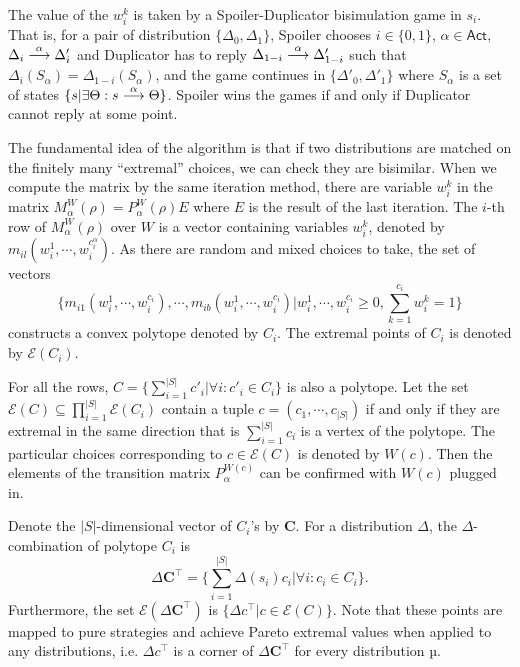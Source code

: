 \documentclass[runningheads]{llncs}
\begin{document}
The value of the $w^{k}_{i}$ is taken by a Spoiler-Duplicator bisimulation game in $s_{i}$. That is, for a pair of distribution $\{\Delta_{0},\Delta_{1}\}$, Spoiler chooses $i\in\{0,1\}$, $\alpha\in\mathsf{Act}$, $\Delta_{i}\mathrel{\stackrel{\alpha}{\longrightarrow}}\Delta'_{i}$ and Duplicator has to reply 
$\Delta_{1-i}\mathrel{\stackrel{\alpha}{\longrightarrow}}\Delta'_{1-i}$ such that $\Delta_{i}(S_{\alpha})=\Delta_{1-i}(S_{\alpha})$, and the game continues in $\{\Delta'_{0},\Delta'_{1}\}$ where $S_{\alpha}$ is a set of states $\{s|\exists\Theta : s\mathrel{\stackrel{\alpha}{\longrightarrow}}\Theta\}$. Spoiler wins the games if and only if Duplicator cannot reply at some point.

The fundamental idea of the algorithm is that if two distributions are matched on the finitely many ``extremal'' choices, we can check they are bisimilar. When we compute the matrix by the same iteration method, there are variable $w^{k}_{i}$ in the matrix $M^{W}_{\alpha}(\rho)=P^{W}_{\alpha}(\rho)E$ where $E$ is the result of the last iteration.
The $i$-th row of $M^{W}_{\alpha}(\rho)$ over $W$ is a vector containing variables $w^{k}_{i}$, denoted by $m_{il}(w^{1}_{i},\cdots,w^{c^{\alpha}_{i}}_{i})$. As there are random and mixed choices to take, the set of vectors
\[\{m_{i1}(w^{1}_{i},\cdots,w^{c_{i}}_{i}),\cdots,m_{ib}(w^{1}_{i},\cdots,w^{c_{i}}_{i})|w^{1}_{i},\cdots,w^{c_{i}}_{i}\geq 0,\sum^{c_i}_{k=1}w^{k}_{i}=1\}\]
constructs a convex polytope denoted by $C_{i}$. The extremal points of $C_{i}$ is denoted by $\mathcal{E}(C_i)$. 

For all the rows, $C = \{\sum_{i=1}^{|S|}c'_{i}|\forall i : c'_{i}\in C_{i}\}$ is also a polytope. Let the set $\mathcal{E}(C)\subseteq\prod^{|S|}_{i=1}\mathcal{E}(C_{i})$ contain a tuple $c=(c_{1},\cdots,c_{|S|})$ if and only if they are extremal in the same direction that is $\sum_{i=1}^{|S|}c_{i}$ is a vertex of the polytope. The particular choices corresponding to $c\in \mathcal{E}(C)$ is denoted by $W(c)$. Then the elements of the transition matrix $P^{W(c)}_{\alpha}$ can be confirmed with $W(c)$ plugged in.

Denote the $|S|$-dimensional vector of $C_{i}$'s by $\textbf{C}$. For a distribution $\Delta$, the $\Delta$-combination of polytope $C_{i}$ is
\[\Delta\textbf{C}^{\top}=\{\sum_{i=1}^{|S|}\Delta(s_{i})c_{i}|\forall i : c_{i}\in C_{i}\}.\]
Furthermore, the set $\mathcal{E}(\Delta\textbf{C}^{\top})$ is $\{\Delta c^{\top}|c\in \mathcal{E}(C)\}$. Note that these points are mapped to pure strategies and achieve Pareto extremal values when applied to any distributions, i.e. $\Delta c^{\top}$ is a corner of $\Delta\textbf{C}^{\top}$ for every distribution µ.
\end{document}
